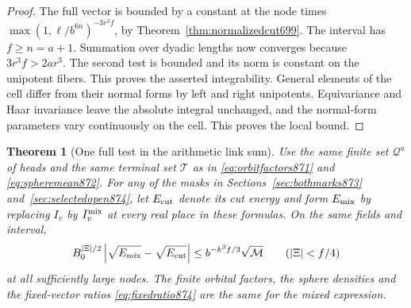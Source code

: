 \documentclass[a4paper,11pt]{article}
\newtheorem{theorem}[proposition]{Theorem}
\theoremstyle{definition}
\theoremstyle{remark}
\numberwithin{equation}{section}
\begin{document}
\begin{proof}
The full vector is bounded by a constant at the node times
\(\max(1,\ell/b^{6n})^{-3r^3 f}\), by
Theorem~\ref{thm:normalizedcut699}. The interval has \(f\ge n=a+1\).
Summation over dyadic lengths now converges because \(3r^3f>2ar^3\).
The second test is bounded and its norm is constant on the unipotent
fibers. This proves the asserted integrability. General elements of
the cell differ from their normal forms by left and right
unipotents. Equivariance and Haar invariance leave the absolute
integral unchanged, and the normal-form parameters vary continuously
on the cell. This proves the local bound.
\end{proof}

\begin{theorem}[One full test in the arithmetic link sum]\leavevmode
\label{thm:mixedperiod876}
Use the same finite set \(\mathcal Q^a\) of heads and the same
terminal set \(\mathcal T\) as in \eqref{eq:orbitfactors871}
and \eqref{eq:spheremean872}. For any of the masks in
Sections~\ref{sec:bothmarks873} and~\ref{sec:selectedopen874}, let
\(E_{\rm cut}\) denote its cut energy and form \(E_{\rm mix}\)
by replacing \(I_v\) by \(I_v^{\rm mix}\) at every real place in
these formulas. On the same fields and interval,
\begin{equation}
  B_0^{|\Xi|/2}
  \left|\sqrt{E_{\rm mix}}-\sqrt{E_{\rm cut}}\right|
       \le b^{-k^3 f/3}\sqrt{\mathcal M}
       \qquad (|\Xi|<f/4)
 \label{eq:mixedperiod876}
\end{equation}
at all sufficiently large nodes. The finite orbital factors,
the sphere densities and the fixed-vector ratios
\eqref{eq:fixedratio874} are the same for the mixed expression.
\end{theorem}
\end{document}
